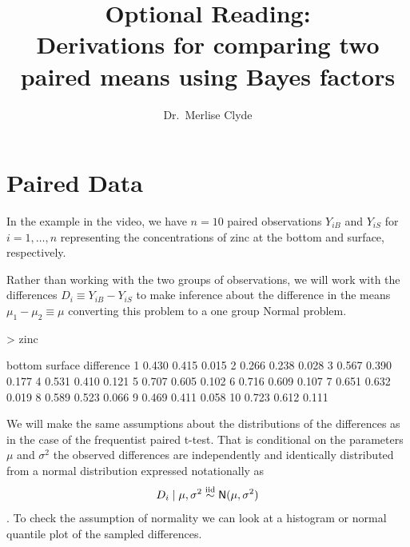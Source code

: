 \documentclass[11pt]{article}
\title{Optional Reading:\\ Derivations for comparing two paired means using Bayes factors}
\author{Dr.~Merlise Clyde}
\date{}
\def\No{\textsf{N}}
\newcommand{\iid}{\ensuremath{\mathrel{\mathop{\sim}\limits^{\rm iid}}}}
\begin{document}



\maketitle








\section*{Paired Data}
In the example in the video,  we have $n = 10$ paired observations $Y_{iB}$ and $Y_{iS}$  for $i = 1, \ldots, n$ representing the concentrations of zinc at the bottom and surface, respectively.



Rather than working with the two groups of observations, we will work with the differences $D_{i} \equiv Y_{iB} - Y_{iS}$ to make inference about the difference in the means $\mu_1 - \mu_2 \equiv \mu$ converting this problem to a one group Normal problem.   

\begin{Schunk}
\begin{Sinput}
> zinc
\end{Sinput}
\begin{Soutput}
   bottom surface difference
1   0.430   0.415      0.015
2   0.266   0.238      0.028
3   0.567   0.390      0.177
4   0.531   0.410      0.121
5   0.707   0.605      0.102
6   0.716   0.609      0.107
7   0.651   0.632      0.019
8   0.589   0.523      0.066
9   0.469   0.411      0.058
10  0.723   0.612      0.111
\end{Soutput}
\end{Schunk}

We will make the same assumptions about the distributions of the differences as in the case of the frequentist paired t-test.  That is conditional on the parameters $\mu$ and $\sigma^2$
the observed differences are independently and identically distributed from a  normal distribution expressed notationally as
$$D_i \mid \mu, \sigma^2 \iid \No(\mu, \sigma^2)$$.  To check the assumption of normality we can look at a histogram or normal quantile plot of the sampled differences. 
\end{document}
